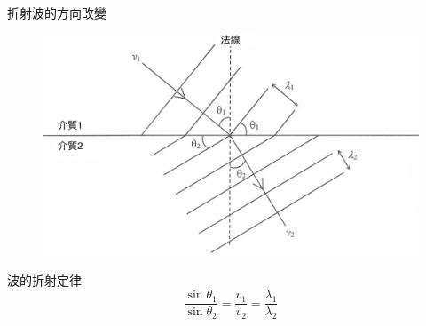 \documentclass[13pt]{beamer}
\begin{document}
\begin{frame}{折射波的方向改變}
    \begin{figure}
        \centering
        \includegraphics[width=0.6\linewidth]{images/Screenshot 2023-09-27 at 7.58.53 PM.png}
    \end{figure}
    \begin{alertblock}{波的折射定律}
        \[\frac{\sin \theta_1}{\sin\theta_2}=\frac{v_1}{v_2}=\frac{\lambda_1}{\lambda_2}\]
    \end{alertblock}
\end{frame}
\end{document}
